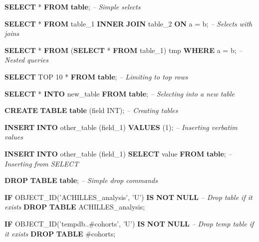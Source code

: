 \documentclass[]{article}
\newenvironment{Shaded}{\begin{snugshade}}{\end{snugshade}}
\newcommand{\CommentTok}[1]{\textcolor[rgb]{0.56,0.35,0.01}{\textit{#1}}}
\newcommand{\DataTypeTok}[1]{\textcolor[rgb]{0.13,0.29,0.53}{#1}}
\newcommand{\DecValTok}[1]{\textcolor[rgb]{0.00,0.00,0.81}{#1}}
\newcommand{\FunctionTok}[1]{\textcolor[rgb]{0.00,0.00,0.00}{#1}}
\newcommand{\KeywordTok}[1]{\textcolor[rgb]{0.13,0.29,0.53}{\textbf{#1}}}
\newcommand{\NormalTok}[1]{#1}
\newcommand{\StringTok}[1]{\textcolor[rgb]{0.31,0.60,0.02}{#1}}
\begin{document}
\begin{Shaded}
\begin{Highlighting}[]
\KeywordTok{SELECT}\NormalTok{ * }\KeywordTok{FROM} \KeywordTok{table}\NormalTok{;                                        }\CommentTok{-- Simple selects}

\KeywordTok{SELECT}\NormalTok{ * }\KeywordTok{FROM}\NormalTok{ table_1 }\KeywordTok{INNER} \KeywordTok{JOIN}\NormalTok{ table_2 }\KeywordTok{ON}\NormalTok{ a = b;          }\CommentTok{-- Selects with joins }

\KeywordTok{SELECT}\NormalTok{ * }\KeywordTok{FROM}\NormalTok{ (}\KeywordTok{SELECT}\NormalTok{ * }\KeywordTok{FROM}\NormalTok{ table_1) tmp }\KeywordTok{WHERE}\NormalTok{ a = b;      }\CommentTok{-- Nested queries}

\KeywordTok{SELECT}\NormalTok{ TOP }\DecValTok{10}\NormalTok{ * }\KeywordTok{FROM} \KeywordTok{table}\NormalTok{;                                 }\CommentTok{-- Limiting to top rows}

\KeywordTok{SELECT}\NormalTok{ * }\KeywordTok{INTO}\NormalTok{ new_table }\KeywordTok{FROM} \KeywordTok{table}\NormalTok{;                         }\CommentTok{-- Selecting into a new table}

\KeywordTok{CREATE} \KeywordTok{TABLE} \KeywordTok{table}\NormalTok{ (field }\DataTypeTok{INT}\NormalTok{);                             }\CommentTok{-- Creating tables}

\KeywordTok{INSERT} \KeywordTok{INTO}\NormalTok{ other_table (field_1) }\KeywordTok{VALUES}\NormalTok{ (}\DecValTok{1}\NormalTok{);               }\CommentTok{-- Inserting verbatim values           }

\KeywordTok{INSERT} \KeywordTok{INTO}\NormalTok{ other_table (field_1) }\KeywordTok{SELECT} \FunctionTok{value} \KeywordTok{FROM} \KeywordTok{table}\NormalTok{;  }\CommentTok{-- Inserting from SELECT}
  
\KeywordTok{DROP} \KeywordTok{TABLE} \KeywordTok{table}\NormalTok{;                                           }\CommentTok{-- Simple drop commands}

\KeywordTok{IF}\NormalTok{ OBJECT_ID(}\StringTok{'ACHILLES_analysis'}\NormalTok{, }\StringTok{'U'}\NormalTok{) }\KeywordTok{IS} \KeywordTok{NOT} \KeywordTok{NULL}          \CommentTok{-- Drop table if it exists}
  \KeywordTok{DROP} \KeywordTok{TABLE}\NormalTok{ ACHILLES_analysis;}
  
\KeywordTok{IF}\NormalTok{ OBJECT_ID(}\StringTok{'tempdb..#cohorts'}\NormalTok{, }\StringTok{'U'}\NormalTok{) }\KeywordTok{IS} \KeywordTok{NOT} \KeywordTok{NULL}           \CommentTok{-- Drop temp table if it exists}
  \KeywordTok{DROP} \KeywordTok{TABLE}\NormalTok{ #cohorts;  }


\end{Highlighting}
\end{Shaded}
\end{document}
